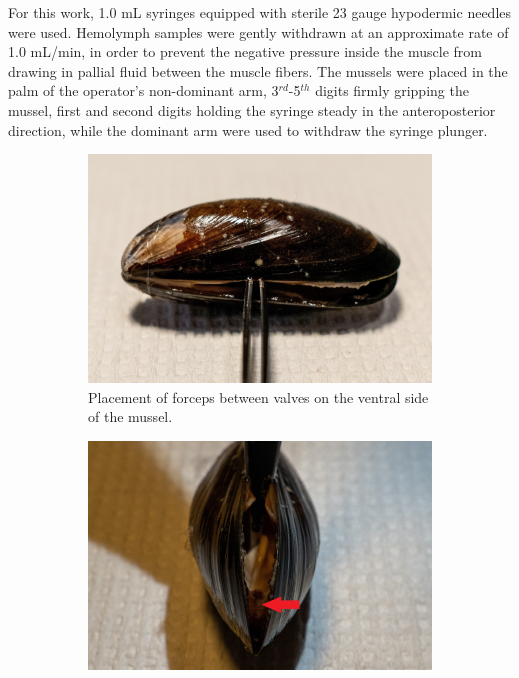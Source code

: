 For this work, 1.0 mL syringes equipped with sterile 23 gauge hypodermic needles were used. Hemolymph samples were gently withdrawn at an approximate rate of 1.0 mL/min, in order to prevent the negative pressure inside the muscle from drawing in pallial fluid between the muscle fibers. The mussels were placed in the palm of the operator's non-dominant arm, 3$^{rd}$-5$^{th}$ digits firmly gripping the mussel, first and second digits holding the syringe steady in the anteroposterior direction, while the dominant arm were used to withdraw the syringe plunger.

\begin{figure}[t]
    \centering
    \begin{subfigure}[b]{.45\textwidth}
        \centering
        \includegraphics[width=\textwidth]{figures/Sampling technique/forceps square color.jpg}
        \caption{Placement of forceps between valves on the ventral side of the mussel.}
        \label{sfig:a}
    \end{subfigure}
    \hfill
    \begin{subfigure}[b]{.45\textwidth}
        \centering
        \includegraphics[width=\textwidth]{figures/Sampling technique/uncut color 3495.jpg}

\end{subfigure}
\end{figure}
